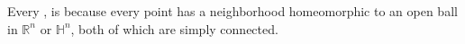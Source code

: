 \begin{proposition} \label{proposition:topological_manifolds_are_locally_simply_connected}
Every , is  because every point has a neighborhood homeomorphic to an open ball in $\mathbb{R}^n$ or $\mathbb{H}^n$, both of which are simply connected. 
\end{proposition}